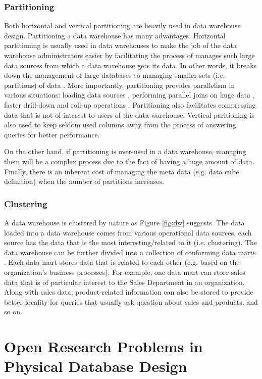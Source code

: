 \documentclass[12pt,a4paper]{article}
\begin{document}
\subsubsection{Partitioning}
Both horizontal and vertical partitioning are heavily used in data warehouse design. Partitioning a data warehouse has many advantages. Horizontal partitioning
is usually used in data warehouses to make the job of the data warehouse administrators easier by facilitating the process of manages such large data
sources from which a data warehouse gets its data. In other words, it breaks down the management of large databases to managing smaller sets (i.e. partitions)
of data \cite{thusoo2010data}. More importantly, partitioning provides parallelism in various situations: loading data sources \cite{barclay1994loading},
performing parallel joins on huge data \cite{datta2002parallel}, faster drill-down and roll-up operations \cite{chaudhuri1997overview}. Partitioning also
facilitates compressing data that is not of interest to users of the data warehouse. Vertical paritioning is also used to keep seldom used columns away from
the process of answering queries for better performance.

On the other hand, if partitioning is over-used in a data warehouse, managing them will be a complex process due to the fact of having a huge amount of data.
Finally, there is an inherent cost of managing the meta data (e.g. data cube definition) when the number of partitions increases.

\subsubsection{Clustering}
A data warehouse is clustered by nature as Figure \ref{fig:dw} suggests. The data loaded into a data warehouse comes from various operational data sources,
each source has the data that is the most interesting/related to it (i.e. clustering). The data warehouse can be further divided into a collection of
conforming data marts \cite{sen2005comparison}. Each data mart stores data that is related to each other (e.g. based on the organization's business processes).
For example, one data mart can store sales data that is of particular interest to the Sales Department in an organization. Along with sales data,
product-related information can also be stored to provide better locality for queries that usually ask question about sales and products, and so on.

\section{Open Research Problems in Physical Database Design}
\label{SEC-OPEN}
\end{document}
